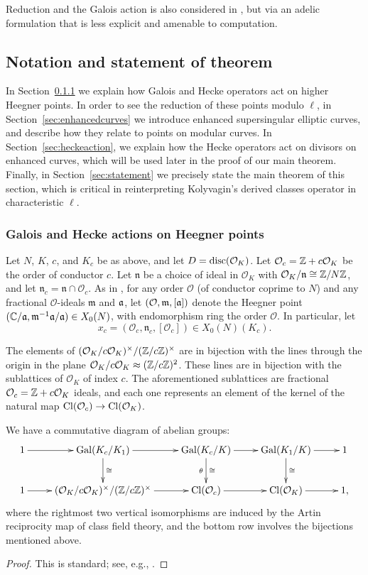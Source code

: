 \documentclass{article} \usepackage[active]{srcltx}
\newcommand{\Oc}{\mathcal{O}_c}
\newcommand{\OK}{\mathcal{O}_K}
\newcommand{\n}{\mathfrak{n}}
\renewcommand{\O}{\mathcal{O}}
\begin{document}
\begin{remark}
  Reduction and the Galois action is also considered in
  \cite[\S3.3]{cornut:mazur}, but via an adelic formulation that is
  less explicit and amenable to computation.
\end{remark}

\subsection{Notation and statement of theorem}\label{sec:notstat}
In Section~\ref{sec:actions} we explain how Galois and Hecke operators
act on higher Heegner points.  In order to see the reduction of these
points modulo $\ell$, in Section~\ref{sec:enhancedcurves} we introduce
enhanced supersingular elliptic curves, and describe how they relate
to points on modular curves.  In Section~\ref{sec:heckeaction}, we
explain how the Hecke operators act on divisors on enhanced curves,
which will be used later in the proof of our main theorem. Finally, in
Section~\ref{sec:statement} we precisely state the main theorem of
this section, which is critical in reinterpreting Kolyvagin's derived
classes operator in characteristic $\ell$.

\subsubsection{Galois and Hecke actions on Heegner points}\label{sec:actions}
Let $N$, $K$, $c$, and $K_c$ be as above, and let $D=\disc(\OK)$.  Let
$\Oc=\Z+c\OK$ be the order of conductor $c$.  Let $\n$ be a choice of
ideal in $\OK$ with $\OK/\n\isom \Z/N\Z$, and let $\n_c=\n\cap \Oc$.
As in \cite{gross:heegnerX0N}, for any order $\O$ (of conductor
coprime to $N$) and any fractional $\O$-ideals $\mathfrak{m}$ and
$\mathfrak{\mathfrak{a}}$, let $(\O,\mathfrak{m},[\a])$ denote the Heegner point
$(\mathbb{C}/\mathfrak{a}, \mathfrak{m}^{-1}\mathfrak{a}/\mathfrak{a})\in X_0(N)$, with endomorphism ring
the order $\O$.  In particular, let $$x_c = (\O_c,\n_c,[\O_c]) \in
X_0(N)(K_c).$$

The elements of $(\OK/c\OK)^{\times}/(\Z/c\Z)^{\times}$ are in bijection with the
lines through the origin in the plane $\OK/c\OK\ncisom (\Z/c\Z)^2$.
These lines are in bijection with the sublattices of $\OK$ of index
$c$.  The aforementioned sublattices are fractional $\Oc=\Z+c\OK$
ideals, and each one represents an element of the kernel of the natural map
$\Cl(\Oc)\to\Cl(\OK)$. 

\begin{proposition}\label{prop:bigdiag} We have a commutative diagram
of abelian groups:
$$
\xymatrix{ 1 \ar[r]& {\Gal(K_c/K_1)}\ar[r]\ar[d]^{\isom} &
{\Gal(K_c/K)}\ar[r]\ar[d]^{\isom}_{\theta} &
{\Gal(K_1/K)}\ar[r]\ar[d]^{\isom} & 1\\ 1 \ar[r]&
{(\OK/c\OK)^{\times}/(\Z/c\Z)^{\times}}\ar[r] & {\Cl(\Oc)}\ar[r] & {\Cl(\OK)} \ar[r]
& 1, }
$$
where the rightmost two vertical isomorphisms are induced by the Artin
reciprocity map of class field theory, and the bottom row involves the
bijections mentioned above.
\end{proposition}
\begin{proof} This is standard; see, e.g., \cite[\S3]{gross:kolyvagin}.
\end{proof}
\end{document}
